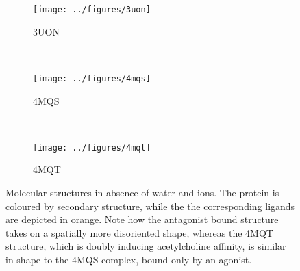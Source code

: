 \documentclass[10pt]{article}\usepackage[]{graphicx}\usepackage[]{color}
\theoremstyle{plain}
\begin{document}
\begin{multicols*}{2}
  \begin{figure}[t]
    \centering
    \begin{subfigure}[H]{.33\textwidth}
      \texttt{[image: ../figures/3uon]}
      \caption{3UON}
    \end{subfigure}~
    \begin{subfigure}[H]{.33\textwidth}
      \texttt{[image: ../figures/4mqs]}
      \caption{4MQS}
    \end{subfigure}~
    \begin{subfigure}[H]{.33\textwidth}
      \texttt{[image: ../figures/4mqt]}
      \caption{4MQT}
    \end{subfigure}
    \caption{Molecular structures in absence of water and ions. The protein is coloured by secondary structure, while the the corresponding ligands are depicted in orange. Note how the antagonist bound structure takes on a spatially more disoriented shape, whereas the 4MQT structure, which is doubly inducing acetylcholine affinity, is similar in shape to the 4MQS complex, bound only by an agonist.}
    \label{fig:structures}
  \end{figure}
  

\end{multicols*}
\end{document}
